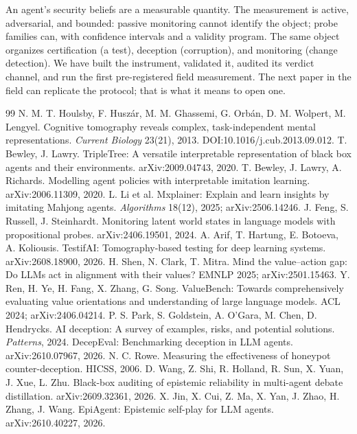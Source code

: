 \documentclass[acmsmall,review,anonymous]{acmart}
\begin{document}
An agent's security beliefs are a measurable quantity. The measurement is
active, adversarial, and bounded: passive monitoring cannot identify the object;
probe families can, with confidence intervals and a validity program. The same
object organizes certification (a test), deception (corruption), and monitoring
(change detection). We have built the instrument, validated it, audited its
verdict channel, and run the first pre-registered field measurement. The next
paper in the field can replicate the protocol; that is what it means to open
one.


\begin{thebibliography}{99}\small
{} N. M. T. Houlsby, F. Husz\'ar, M. M. Ghassemi, G. Orb\'an, D. M. Wolpert, M. Lengyel. Cognitive tomography reveals complex, task-independent mental representations. \emph{Current Biology} 23(21), 2013. DOI:10.1016/j.cub.2013.09.012.
 T. Bewley, J. Lawry. TripleTree: A versatile interpretable representation of black box agents and their environments. arXiv:2009.04743, 2020.
 T. Bewley, J. Lawry, A. Richards. Modelling agent policies with interpretable imitation learning. arXiv:2006.11309, 2020.
 L. Li et al. Mxplainer: Explain and learn insights by imitating Mahjong agents. \emph{Algorithms} 18(12), 2025; arXiv:2506.14246.
 J. Feng, S. Russell, J. Steinhardt. Monitoring latent world states in language models with propositional probes. arXiv:2406.19501, 2024.
 A. Arif, T. Hartung, E. Botoeva, A. Koliousis. TestifAI: Tomography-based testing for deep learning systems. arXiv:2608.18900, 2026.
 H. Shen, N. Clark, T. Mitra. Mind the value--action gap: Do LLMs act in alignment with their values? EMNLP 2025; arXiv:2501.15463.
 Y. Ren, H. Ye, H. Fang, X. Zhang, G. Song. ValueBench: Towards comprehensively evaluating value orientations and understanding of large language models. ACL 2024; arXiv:2406.04214.
 P. S. Park, S. Goldstein, A. O'Gara, M. Chen, D. Hendrycks. AI deception: A survey of examples, risks, and potential solutions. \emph{Patterns}, 2024.
 DecepEval: Benchmarking deception in LLM agents. arXiv:2610.07967, 2026.
 N. C. Rowe. Measuring the effectiveness of honeypot counter-deception. HICSS, 2006.
 D. Wang, Z. Shi, R. Holland, R. Sun, X. Yuan, J. Xue, L. Zhu. Black-box auditing of epistemic reliability in multi-agent debate distillation. arXiv:2609.32361, 2026.
 X. Jin, X. Cui, Z. Ma, X. Yan, J. Zhao, H. Zhang, J. Wang. EpiAgent: Epistemic self-play for LLM agents. arXiv:2610.40227, 2026.

\end{thebibliography}
\end{document}
